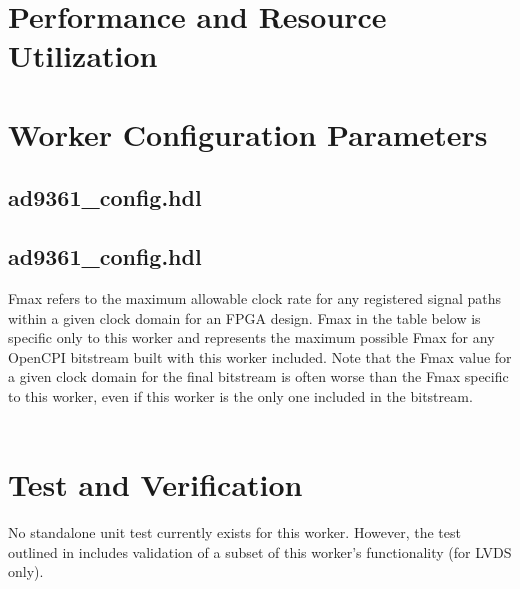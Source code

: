 \documentclass{article}
\def\comp{ad9361\_config}
\edef\ecomp{ad9361_config}
\begin{document}
\begin{landscape}
\section{Performance and Resource Utilization}
\section{Worker Configuration Parameters}
\subsection{\comp.hdl}

\subsection{\comp.hdl}
Fmax refers to the maximum allowable clock rate for any registered signal paths within a given clock domain for an FPGA design. Fmax in the table below is specific only to this worker and represents the maximum possible Fmax for any OpenCPI bitstream built with this worker included. Note that the Fmax value for a given clock domain for the final bitstream is often worse than the Fmax specific to this worker, even if this worker is the only one included in the bitstream. \\ \\

%


\end{landscape}


\section{Test and Verification}
No standalone unit test currently exists for this worker. However, the test outlined in \cite{dac_comp_datasheet} includes validation of a subset of this worker's functionality (for LVDS only).
\end{document}
